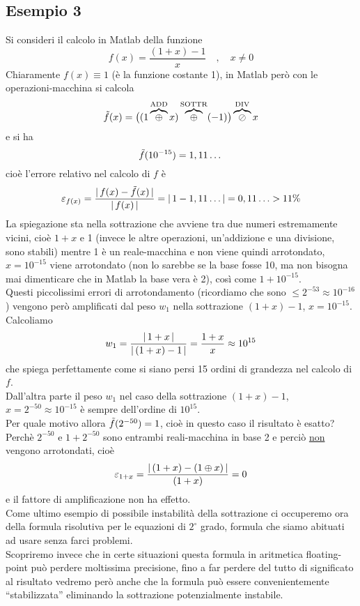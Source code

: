 \documentclass[12pt]{article}
\DeclarePairedDelimiter{\abs}{\lvert}{\rvert}
\begin{document}
\subsection{Esempio 3}
Si consideri il calcolo in Matlab della funzione
\[f(x) = \frac{(1+x)-1}{x} \quad , \quad x \ne 0\]
Chiaramente $f(x) \equiv 1$ (è la funzione costante 1), in Matlab però con le operazioni-macchina si calcola 
\[\Tilde{f}(x) = \bigl( (1 \overbrace{\oplus}^{\text{ADD}} x) \overbrace{\oplus}^{\text{SOTTR}} (-1) \bigr) \overbrace{\oslash}^{\text{DIV}} x\]
e si ha \[\Tilde{f}(10^{-15}) = 1,11 \dotsc\] 
cioè l’errore relativo nel calcolo di $f$ è
\[\varepsilon_{f(x)} = \frac{\abs{\,f(x) - \Tilde{f}(x)\,}}{\abs{\,f(x)\,}} = \abs{\,1 - 1,11 \dotsc\,} = 0,11 \dotsc > 11\%\]
La spiegazione sta nella sottrazione che avviene tra due numeri estremamente vicini, cioè $1 + x$  e  1 (invece le altre operazioni, un’addizione e una divisione, sono stabili) mentre 1 è un reale-macchina e non viene quindi arrotondato, $x=10^{-15}$ viene arrotondato (non lo sarebbe se la base fosse 10, ma non bisogna mai dimenticare che in Matlab la base vera è 2), così come $1 + 10^{-15}$.\\
Questi piccolissimi errori di arrotondamento (ricordiamo che sono $\le 2^{-53} \approx 10^{-16}$) vengono però amplificati dal peso $w_1$ nella sottrazione $(1 + x) - 1$, $x = 10^{-15}$.\\
Calcoliamo
\[w_1 = \frac{\abs{\,1+x\,}}{\abs{\,(1+x)-1\,}} = \frac{1+x}{x} \approx 10^{15}\]
che spiega perfettamente come si siano persi 15 ordini di grandezza nel calcolo di $f$.\\
Dall'altra parte il peso $w_1$ nel caso della sottrazione $(1+x)-1$, $x=2^{-50} \approx 10^{-15}$ è sempre dell'ordine di $10^{15}$.\\
Per quale motivo allora $\Tilde{f}(2^{-50}) = 1$, cioè in questo caso il risultato è esatto?\\
Perchè $2^{-50}$ e $1+2^{-50}$ sono entrambi reali-macchina in base 2 e perciò \uline{non} vengono arrotondati, cioè 
\[\varepsilon_{1+x} = \frac{\abs{\,(1+x)-(1\oplus x)\,}}{(1+x)} = 0\]
e il fattore di amplificazione non ha effetto.\\

Come ultimo esempio di possibile instabilità della sottrazione ci occuperemo ora della formula risolutiva per le equazioni di $2^\circ$ grado, formula che siamo abituati ad usare senza farci problemi.\\
Scopriremo invece che in certe situazioni questa formula in aritmetica floating-point può perdere moltissima precisione, fino a far perdere del tutto di significato al risultato vedremo però anche che la formula può essere convenientemente “stabilizzata” eliminando la sottrazione potenzialmente instabile.
\end{document}
